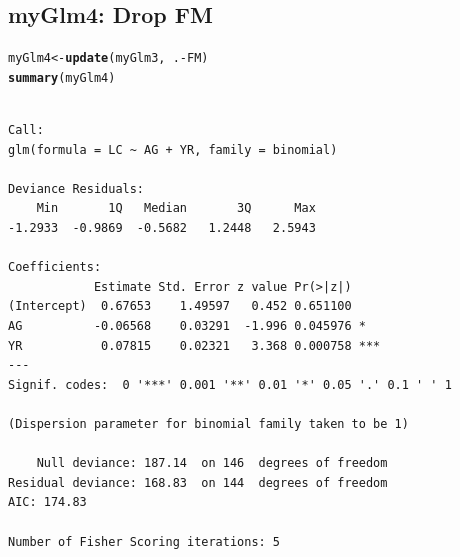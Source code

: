 \documentclass[oneside]{book}\usepackage[]{graphicx}\usepackage[svgnames]{xcolor}
\makeatletter
\newcommand{\hlopt}[1]{\textcolor[rgb]{0,0,0}{#1}}%
\newcommand{\hlstd}[1]{\textcolor[rgb]{0.345,0.345,0.345}{#1}}%
\newcommand{\hlkwb}[1]{\textcolor[rgb]{0.69,0.353,0.396}{#1}}%
\newcommand{\hlkwd}[1]{\textcolor[rgb]{0.737,0.353,0.396}{\textbf{#1}}}%
\newenvironment{kframe}{%
 \def\at@end@of@kframe{}%
 \ifinner\ifhmode%
  \def\at@end@of@kframe{\end{minipage}}%
  \begin{minipage}{\columnwidth}%
 \fi\fi%
 \def\FrameCommand##1{\hskip\@totalleftmargin \hskip-\fboxsep
 \colorbox{shadecolor}{##1}\hskip-\fboxsep
     \hskip-\linewidth \hskip-\@totalleftmargin \hskip\columnwidth}%
 \MakeFramed {\advance\hsize-\width
   \@totalleftmargin\z@ \linewidth\hsize
   \@setminipage}}%
 {\par\unskip\endMakeFramed%
 \at@end@of@kframe}
\newenvironment{knitrout}{}{} %
\makeatother
\begin{document}
\subsection*{myGlm4: Drop FM}
\begin{knitrout}
\color{fgcolor}\begin{kframe}
\begin{alltt}
\hlstd{myGlm4} \hlkwb{<-} \hlkwd{update}\hlstd{(myGlm3,} \hlopt{~}\hlstd{.} \hlopt{-} \hlstd{FM)}
\hlkwd{summary}\hlstd{(myGlm4)}
\end{alltt}
\begin{verbatim}

Call:
glm(formula = LC ~ AG + YR, family = binomial)

Deviance Residuals: 
    Min       1Q   Median       3Q      Max  
-1.2933  -0.9869  -0.5682   1.2448   2.5943  

Coefficients:
            Estimate Std. Error z value Pr(>|z|)    
(Intercept)  0.67653    1.49597   0.452 0.651100    
AG          -0.06568    0.03291  -1.996 0.045976 *  
YR           0.07815    0.02321   3.368 0.000758 ***
---
Signif. codes:  0 '***' 0.001 '**' 0.01 '*' 0.05 '.' 0.1 ' ' 1

(Dispersion parameter for binomial family taken to be 1)

    Null deviance: 187.14  on 146  degrees of freedom
Residual deviance: 168.83  on 144  degrees of freedom
AIC: 174.83

Number of Fisher Scoring iterations: 5
\end{verbatim}
\end{kframe}
\end{knitrout}
\end{document}
